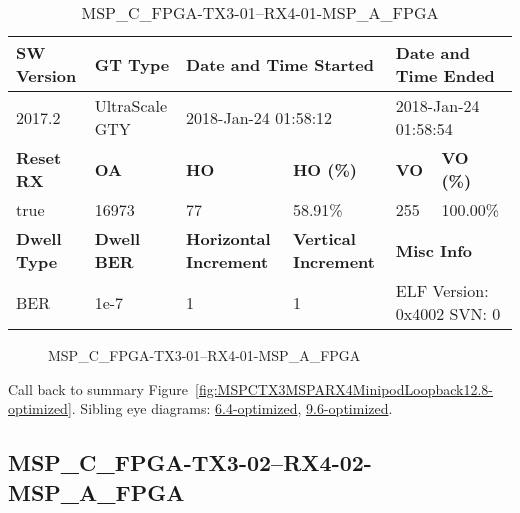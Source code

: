 \begin{table}[h]
\centering
\caption{MSP\_C\_FPGA-TX3-01--RX4-01-MSP\_A\_FPGA}
\label{tab:MSPCFPGATX301RX401MSPAFPGA12.8-optimized}
\begin{tabular}{@{}|l|l|l|l|l|l|@{}}
\toprule
\textbf{SW Version}                & \textbf{GT Type}   & \multicolumn{2}{l|}{\textbf{Date and Time Started}}            & \multicolumn{2}{l|}{\textbf{Date and Time Ended}}        \\ \midrule
2017.2                       & UltraScale GTY          & \multicolumn{2}{l|}{2018-Jan-24 01:58:12}                   & \multicolumn{2}{l|}{2018-Jan-24 01:58:54}               \\ \midrule
\textbf{Reset RX}                  & \textbf{OA} & \textbf{HO}   & \textbf{HO (\%)} & \textbf{VO} & \textbf{VO (\%)} \\ \midrule
true & 16973        & 77          & 58.91\%        & 255        & 100.00\%       \\ \midrule
\textbf{Dwell Type}                & \textbf{Dwell BER} & \textbf{Horizontal Increment} & \textbf{Vertical Increment}    & \multicolumn{2}{l|}{\textbf{Misc Info}}                  \\ \midrule
BER                            & 1e-7        & 1        & 1           & \multicolumn{2}{l|}{ELF Version: 0x4002 SVN: 0}                         \\ \bottomrule
\end{tabular}
\end{table}

\begin{figure}[h]
\caption{MSP\_C\_FPGA-TX3-01--RX4-01-MSP\_A\_FPGA} \label{fig:MSPCFPGATX301RX401MSPAFPGA12.8-optimized}
\end{figure}

Call back to summary Figure~\ref{fig:MSPCTX3MSPARX4MinipodLoopback12.8-optimized}.
Sibling eye diagrams: \hyperref[sec:MSPCFPGATX301RX401MSPAFPGA6.4-optimized]{6.4-optimized}, \hyperref[sec:MSPCFPGATX301RX401MSPAFPGA9.6-optimized]{9.6-optimized}.

\clearpage
\newpage


\subsection{MSP\_C\_FPGA-TX3-02--RX4-02-MSP\_A\_FPGA}\label{sec:MSPCFPGATX302RX402MSPAFPGA12.8-optimized}

